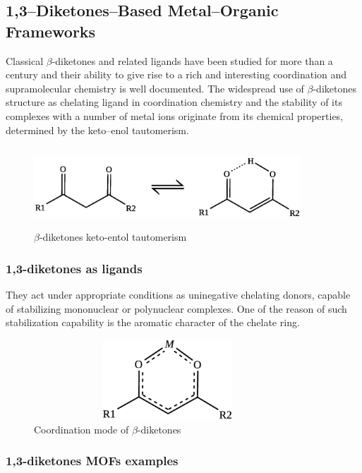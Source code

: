 \documentclass[../Master.tex]{subfiles}
\begin{document}
\subsection{1,3–Diketones–Based Metal–Organic Frameworks}\label{dk-mof}
Classical \(\beta\)-diketones and related ligands have been studied for more than a century and their ability to give rise to a rich and interesting coordination and supramolecular chemistry is well documented\cite{aromi_poly_2008}. The widespread use of \(\beta\)-diketones structure as chelating ligand in coordination chemistry and the stability of its complexes with a number of metal ions originate from its chemical properties, determined by the keto–enol tautomerism.

\begin{figure}[h!]
	\centering
	\includegraphics[width=10cm,height=3cm,keepaspectratio]{Structures/diktau.eps}
	\caption{\(\beta\)-diketones keto-entol tautomerism}\label{fig:diktau}
\end{figure}

\subsubsection{1,3-diketones as ligands}
They act under appropriate conditions as uninegative chelating donors, capable of stabilizing mononuclear or polynuclear complexes. One of the reason of such stabilization capability is the aromatic character of the chelate ring.
\begin{figure}[h]
	\centering
	\includegraphics[width=10cm,height=3cm,keepaspectratio]{Structures/dikcordmode.eps}
	\caption{Coordination mode of $\beta$-diketones}\label{fig:diktaucordmode}
\end{figure}

\subsubsection{1,3-diketones MOFs examples}
\end{document}
